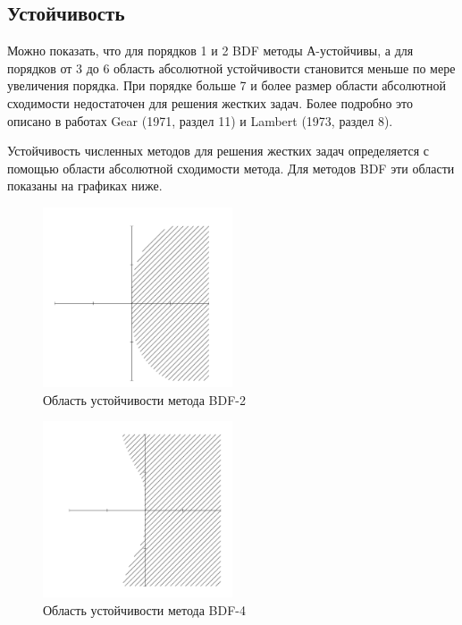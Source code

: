 \documentclass[12pt, a4paper]{article}
\begin{document}
\subsection{Устойчивость}

Можно показать, что для порядков 1 и 2 BDF методы А-устойчивы, а для порядков от 3 до 6 область абсолютной устойчивости становится меньше по мере увеличения порядка. При порядке больше 7 и более размер области абсолютной сходимости недостаточен для решения жестких задач. Более подробно это описано в работах Gear (1971, раздел 11) и Lambert (1973, раздел 8).

Устойчивость численных методов для решения жестких задач определяется с помощью области абсолютной сходимости метода. Для методов BDF эти области показаны на графиках ниже.

\begin{figure}[!htbp]
	\centering
	\includegraphics[width=0.5\textwidth]{lin-stab-bdf-2}%
	\caption{Область устойчивости метода BDF-2}
	\vspace*{-2mm}
	\label{ser_graph}
\end{figure}

\begin{figure}[!htbp]
	\centering
	\includegraphics[width=0.5\textwidth]{lin-stab-bdf-4}%
	\caption{Область устойчивости метода BDF-4}
	\vspace*{-2mm}
	\label{ser_graph}
\end{figure}
\end{document}
